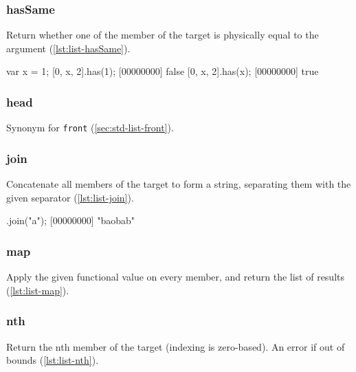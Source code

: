 \subsubsection{hasSame}

Return whether one of the member of the target is physically equal to
the argument (\autoref{lst:list-hasSame}).

\begin{urbiscript}[caption=List.hasSame, label=lst:list-hasSame, float=\floatposh]
  var x = 1;
  [0, x, 2].has(1);
  [00000000] false
  [0, x, 2].has(x);
  [00000000] true
\end{urbiscript}

\subsubsection{head}

Synonym for \lstinline|front| (\autoref{sec:std-list-front}).

\subsubsection{join}

Concatenate all members of the target to form a string, separating
them with the given separator (\autoref{lst:list-join}).

\begin{urbiscript}[caption=List.join, label=lst:list-join, float=\floatposh]
  ["b", "ob", "b"].join("a");
  [00000000] "baobab"
\end{urbiscript}

\subsubsection{map}

Apply the given functional value on every member, and return the list
of results (\autoref{lst:list-map}).


\subsubsection{nth}
\label{sec:std-list-nth}

Return the nth member of the target (indexing is zero-based). An error
if out of bounds (\autoref{lst:list-nth}).

